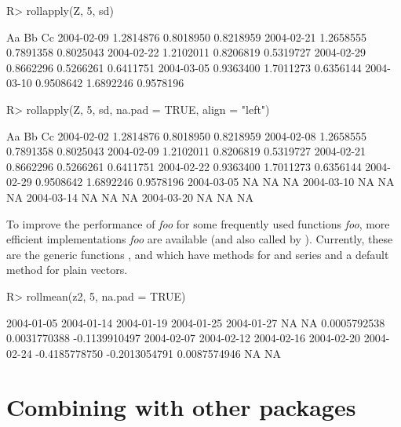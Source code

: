 \documentclass[article,nojss]{jss}
\begin{document}
\begin{Schunk}
\begin{Sinput}
R> rollapply(Z, 5, sd)
\end{Sinput}
\begin{Soutput}
                  Aa        Bb        Cc
2004-02-09 1.2814876 0.8018950 0.8218959
2004-02-21 1.2658555 0.7891358 0.8025043
2004-02-22 1.2102011 0.8206819 0.5319727
2004-02-29 0.8662296 0.5266261 0.6411751
2004-03-05 0.9363400 1.7011273 0.6356144
2004-03-10 0.9508642 1.6892246 0.9578196
\end{Soutput}
\begin{Sinput}
R> rollapply(Z, 5, sd, na.pad = TRUE, align = "left")
\end{Sinput}
\begin{Soutput}
                  Aa        Bb        Cc
2004-02-02 1.2814876 0.8018950 0.8218959
2004-02-08 1.2658555 0.7891358 0.8025043
2004-02-09 1.2102011 0.8206819 0.5319727
2004-02-21 0.8662296 0.5266261 0.6411751
2004-02-22 0.9363400 1.7011273 0.6356144
2004-02-29 0.9508642 1.6892246 0.9578196
2004-03-05        NA        NA        NA
2004-03-10        NA        NA        NA
2004-03-14        NA        NA        NA
2004-03-20        NA        NA        NA
\end{Soutput}
\end{Schunk}

To improve the performance of \textit{foo}\code{)} for some frequently
used functions \textit{foo}, more efficient implementations \textit{foo}
are available (and also called by ). 
Currently, these are the generic functions , 
and  which have methods for  and  series and a 
default method for plain vectors.

\begin{Schunk}
\begin{Sinput}
R> rollmean(z2, 5, na.pad = TRUE)
\end{Sinput}
\begin{Soutput}
   2004-01-05    2004-01-14    2004-01-19    2004-01-25    2004-01-27 
           NA            NA  0.0005792538  0.0031770388 -0.1139910497 
   2004-02-07    2004-02-12    2004-02-16    2004-02-20    2004-02-24 
-0.4185778750 -0.2013054791  0.0087574946            NA            NA 
\end{Soutput}
\end{Schunk}


\section[Combining zoo with other packages]{Combining  with other packages}
\label{sec:combining}
\end{document}

